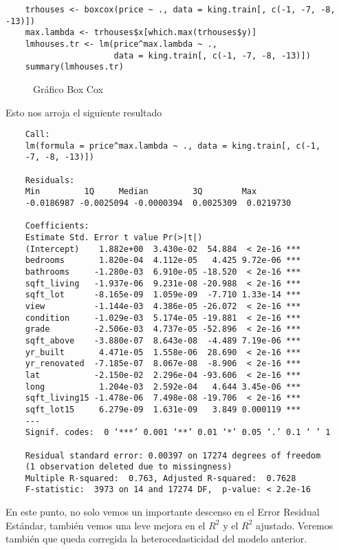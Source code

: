 \documentclass[10pt,letterpaper]{article}
\begin{document}
\begin{verbatim}
	trhouses <- boxcox(price ~ ., data = king.train[, c(-1, -7, -8, -13)])
	max.lambda <- trhouses$x[which.max(trhouses$y)]
	lmhouses.tr <- lm(price^max.lambda ~ ., 
					  data = king.train[, c(-1, -7, -8, -13)])
	summary(lmhouses.tr)
\end{verbatim}

\begin{figure}[h!]
	\caption{Gráfico Box Cox}
\end{figure}

Esto nos arroja el siguiente resultado

\begin{verbatim}
	Call:
	lm(formula = price^max.lambda ~ ., data = king.train[, c(-1, 
	-7, -8, -13)])
	
	Residuals:
	Min         1Q     Median         3Q        Max 
	-0.0186987 -0.0025094 -0.0000394  0.0025309  0.0219730 
	
	Coefficients:
	Estimate Std. Error t value Pr(>|t|)    
	(Intercept)    1.882e+00  3.430e-02  54.884  < 2e-16 ***
	bedrooms       1.820e-04  4.112e-05   4.425 9.72e-06 ***
	bathrooms     -1.280e-03  6.910e-05 -18.520  < 2e-16 ***
	sqft_living   -1.937e-06  9.231e-08 -20.988  < 2e-16 ***
	sqft_lot      -8.165e-09  1.059e-09  -7.710 1.33e-14 ***
	view          -1.144e-03  4.386e-05 -26.072  < 2e-16 ***
	condition     -1.029e-03  5.174e-05 -19.881  < 2e-16 ***
	grade         -2.506e-03  4.737e-05 -52.896  < 2e-16 ***
	sqft_above    -3.880e-07  8.643e-08  -4.489 7.19e-06 ***
	yr_built       4.471e-05  1.558e-06  28.690  < 2e-16 ***
	yr_renovated  -7.185e-07  8.067e-08  -8.906  < 2e-16 ***
	lat           -2.150e-02  2.296e-04 -93.606  < 2e-16 ***
	long           1.204e-03  2.592e-04   4.644 3.45e-06 ***
	sqft_living15 -1.478e-06  7.498e-08 -19.706  < 2e-16 ***
	sqft_lot15     6.279e-09  1.631e-09   3.849 0.000119 ***
	---
	Signif. codes:  0 ‘***’ 0.001 ‘**’ 0.01 ‘*’ 0.05 ‘.’ 0.1 ‘ ’ 1
	
	Residual standard error: 0.00397 on 17274 degrees of freedom
	(1 observation deleted due to missingness)
	Multiple R-squared:  0.763,	Adjusted R-squared:  0.7628 
	F-statistic:  3973 on 14 and 17274 DF,  p-value: < 2.2e-16
\end{verbatim}

En este punto, no solo vemos un importante descenso en el Error Residual Estándar, también vemos una leve mejora en el $R^2$ y el $R^2$ ajustado. Veremos también que queda corregida la heterocedasticidad del modelo anterior.
\end{document}
